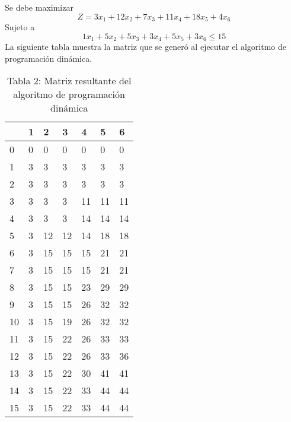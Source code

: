 \documentclass{article}
\begin{document}
Se debe maximizar $$Z = 3x_1+12x_2+7x_3+11x_4+18x_5+4x_6$$ 
Sujeto a $$1x_1+5x_2+5x_3+3x_4+5x_5+3x_6\leq 15$$
La siguiente tabla muestra la matriz que se generó al ejecutar el algoritmo de programación dinámica.
\begin{table}[h]
\centering
\caption*{Tabla 2: Matriz resultante del algoritmo de programación dinámica}
\begin{tabularx}{\textwidth}{|X|X|X|X|X|X|X|}
\hline&1&2&3&4&5&6 \\
\hline 0&\cellcolor{red}0&\cellcolor{red}0&\cellcolor{red}0&\cellcolor{red}0&\cellcolor{red}0&\cellcolor{red}0\\
\hline 1&\cellcolor{green}3&\cellcolor{red}3&\cellcolor{red}3&\cellcolor{red}3&\cellcolor{red}3&\cellcolor{red}3\\
\hline 2&\cellcolor{green}3&\cellcolor{red}3&\cellcolor{red}3&\cellcolor{red}3&\cellcolor{red}3&\cellcolor{red}3\\
\hline 3&\cellcolor{green}3&\cellcolor{red}3&\cellcolor{red}3&\cellcolor{green}11&\cellcolor{red}11&\cellcolor{red}11\\
\hline 4&\cellcolor{green}3&\cellcolor{red}3&\cellcolor{red}3&\cellcolor{green}14&\cellcolor{red}14&\cellcolor{red}14\\
\hline 5&\cellcolor{green}3&\cellcolor{green}12&\cellcolor{red}12&\cellcolor{green}14&\cellcolor{green}18&\cellcolor{red}18\\
\hline 6&\cellcolor{green}3&\cellcolor{green}15&\cellcolor{red}15&\cellcolor{red}15&\cellcolor{green}21&\cellcolor{red}21\\
\hline 7&\cellcolor{green}3&\cellcolor{green}15&\cellcolor{red}15&\cellcolor{red}15&\cellcolor{green}21&\cellcolor{red}21\\
\hline 8&\cellcolor{green}3&\cellcolor{green}15&\cellcolor{red}15&\cellcolor{green}23&\cellcolor{green}29&\cellcolor{red}29\\
\hline 9&\cellcolor{green}3&\cellcolor{green}15&\cellcolor{red}15&\cellcolor{green}26&\cellcolor{green}32&\cellcolor{red}32\\
\hline 10&\cellcolor{green}3&\cellcolor{green}15&\cellcolor{green}19&\cellcolor{green}26&\cellcolor{green}32&\cellcolor{red}32\\
\hline 11&\cellcolor{green}3&\cellcolor{green}15&\cellcolor{green}22&\cellcolor{green}26&\cellcolor{green}33&\cellcolor{red}33\\
\hline 12&\cellcolor{green}3&\cellcolor{green}15&\cellcolor{green}22&\cellcolor{green}26&\cellcolor{green}33&\cellcolor{green}36\\
\hline 13&\cellcolor{green}3&\cellcolor{green}15&\cellcolor{green}22&\cellcolor{green}30&\cellcolor{green}41&\cellcolor{red}41\\
\hline 14&\cellcolor{green}3&\cellcolor{green}15&\cellcolor{green}22&\cellcolor{green}33&\cellcolor{green}44&\cellcolor{red}44\\
\hline 15&\cellcolor{green}3&\cellcolor{green}15&\cellcolor{green}22&\cellcolor{green}33&\cellcolor{green}44&\cellcolor{red}44\\
\hline
\end{tabularx}
\end{table}
\end{document}
